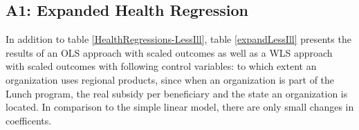 \documentclass[12pt, a4paper, titlepage]{article}\usepackage[]{graphicx}\usepackage[]{color}
\begin{document}
\subsection{A1: Expanded Health Regression}

In addition to table \ref{HealthRegressions-LessIll}, table \ref{expandLessIll} presents the results of an OLS approach with scaled outcomes as well as a WLS approach with scaled outcomes with following control variables: to which extent an organization uses regional products, since when an organization is part of the Lunch program, the real subsidy per beneficiary and the state an organization is located. In comparison to the simple linear model, there are only small changes in coefficents. 

% 


\usepackage{graphicx}
\end{document}
